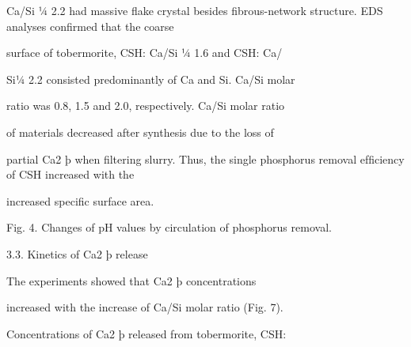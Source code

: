 \documentclass[a4paper,portrait,12pt]{article}
\begin{document}
\begin{flushleft}
Ca/Si ¼ 2.2 had massive ﬂake crystal besides ﬁbrous-network structure. EDS analyses conﬁrmed that the coarse
\end{flushleft}


\begin{flushleft}
surface of tobermorite, CSH: Ca/Si ¼ 1.6 and CSH: Ca/
\end{flushleft}


\begin{flushleft}
Si¼ 2.2 consisted predominantly of Ca and Si. Ca/Si molar
\end{flushleft}


\begin{flushleft}
ratio was 0.8, 1.5 and 2.0, respectively. Ca/Si molar ratio
\end{flushleft}


\begin{flushleft}
of materials decreased after synthesis due to the loss of
\end{flushleft}


\begin{flushleft}
partial Ca2 þ when ﬁltering slurry. Thus, the single phosphorus removal efﬁciency of CSH increased with the
\end{flushleft}


\begin{flushleft}
increased speciﬁc surface area.
\end{flushleft}





\begin{flushleft}
Fig. 4. Changes of pH values by circulation of phosphorus removal.
\end{flushleft}





\begin{flushleft}
3.3. Kinetics of Ca2 þ release
\end{flushleft}


\begin{flushleft}
The experiments showed that Ca2 þ concentrations
\end{flushleft}


\begin{flushleft}
increased with the increase of Ca/Si molar ratio (Fig. 7).
\end{flushleft}


\begin{flushleft}
Concentrations of Ca2 þ released from tobermorite, CSH:
\end{flushleft}
\end{document}

